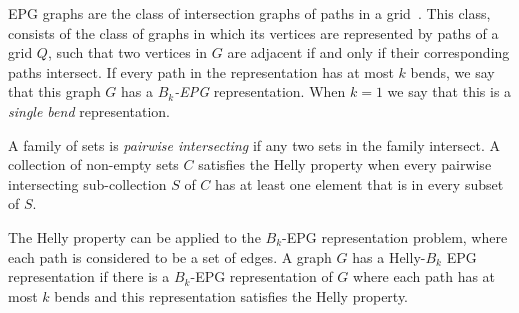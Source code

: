 \documentclass[
submission
]{dmtcs-episciences}
\begin{document}
EPG graphs are the class of intersection graphs of paths in a grid~\cite{golumbic2009}. This class,  consists of the class of graphs in which its vertices are represented by paths of a grid $ Q $, such that two vertices in $ G $ are adjacent if and only if their corresponding paths intersect. If every path in the representation has at most $ k $ bends, we say that this graph $ G $ has a \emph{ $ B_k$-EPG} representation.%
  When $ k = 1 $ we say that this is a \emph{single bend} representation.


A family of sets is \emph{pairwise intersecting} if any two sets in the family intersect. A collection of non-empty sets $C$ satisfies the Helly property when every pairwise intersecting sub-collection $S$ of $ C $ has at least one element that is in every subset of $S$.

The Helly property can be applied to the $ B_k $-EPG representation problem, where each path is considered to be a set of edges. A graph $ G $ has a  Helly-$B_k$ EPG representation if there is a $ B_k $-EPG representation of $G$ where each path has at most $ k $ bends and this representation satisfies the Helly property. %
% 



 
\end{document}
